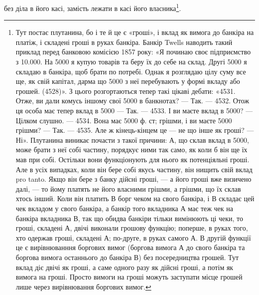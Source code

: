без діла в його касі, замість лежати в касі його власника\footnote{
Тут постає плутанина, бо і те й це є «гроші», і вклад як вимога до банкіра на платіж,
і складені гроші в руках банкіра. Банкір Twells наводить такий приклад перед банковою комісією
1857 року: «Я починаю своє підприємство з \num{10.000}. На 5000 я купую товарів та
беру їх до себе на склад. Другі 5000 я складаю в банкіра, щоб брати по потребі. Однак я
розглядаю цілу суму все ще, як свій капітал, дарма що 5000 з неї перебувають у формі вкладу
або грошей. (4528)». З цього розгортаються тепер такі цікаві дебати: «4531. Отже, ви дали комусь
іншому свої 5000 в банкнотах? — Так. — 4532. Отож ця особа має тепер вклад в 5000 —
Так. — 4533. І ви маєте вклад в 5000? — Цілком слушно. — 4534. Вона має 5000 ф. ст; грішми,
і ви маєте 5000 грішми? — Так. — 4535. Але ж кінець-кінцем це — не що інше як гроші? —
Ні». Плутанина виникає почасти з такої причини: А, що склав вклад в 5000, може брати
з неї собі частину, порядкує ними так само, як коли б він ще їх мав при собі. Остільки вони
функціонують для нього як потенціяльні гроші. Але в усіх випадках, коли він бере собі якусь частину,
він нищить свій вклад pro tanto. Якщо він бере з банку дійсні гроші, — а його гроші вже визичено
далі, — то йому платять не його власними грішми, а грішми, що їх склав хтось інший. Коли він
платить В борг чеком на свого банкіра, і В складає цей чек вкладом у свого банкіра, а банкір того
вкладника А має теж чек на банкіра вкладника В, так що обидва банкіри тільки вимінюють ці чеки,
то гроші, складені А, двічі виконали грошову функцію; поперше, в руках того, хто одержав гроші,
складені
А; по-друге, в руках самого А. В другій функції це є вирівнюванння боргових вимог (боргова вимога А
до
свого банкіра та боргова вимога останнього до банкіра В) без посередництва грошей. Тут вклад діє
двічі як гроші, а саме одного разу як дійсні гроші, а потім як вимога на гроші. Просто вимоги на
гроші можуть заступати місце грошей лише через вирівнювання боргових вимог.
}.


